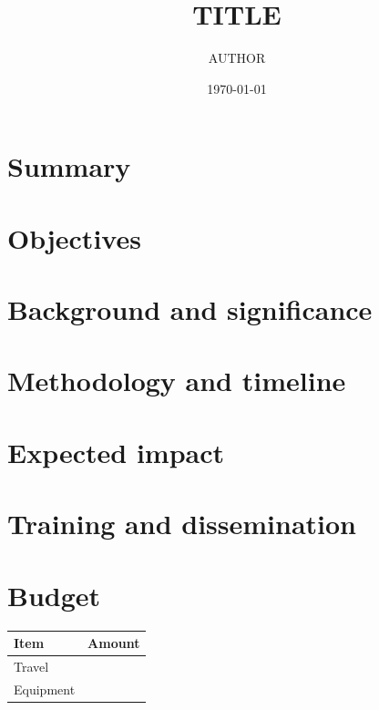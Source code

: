 \documentclass[11pt]{article}
\title{{{TITLE}}}
\author{{{AUTHOR}}}
\date{\today}
\begin{document}
\maketitle
\section{Summary}
\section{Objectives}
\section{Background and significance}
\section{Methodology and timeline}
\section{Expected impact}
\section{Training and dissemination}
\section{Budget}
\begin{tabular}{lr}\toprule Item & Amount \\\midrule Travel & \\ Equipment & \\\bottomrule\end{tabular}


\end{document}
